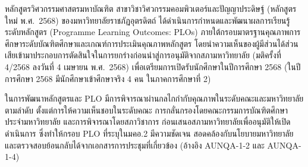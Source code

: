 


หลักสูตรวิศวกรรมศาสตรมหาบัณฑิต สาขาวิชาวิศวกรรมคอมพิวเตอร์และปัญญาประดิษฐ์ (หลักสูตรใหม่ พ.ศ.~2568) ของมหาวิทยาลัยราชภัฏอุตรดิตถ์ ได้ดำเนินการกำหนดและพัฒนาผลการเรียนรู้ระดับหลักสูตร (Programme Learning Outcomes: PLOs) ภายใต้กรอบมาตรฐานคุณภาพการศึกษาระดับบัณฑิตศึกษาและเกณฑ์การประเมินคุณภาพหลักสูตร โดยนำความเห็นของผู้มีส่วนได้ส่วนเสียเข้ามาประกอบการตัดสินใจในการยกร่างก่อนนำสู่การอนุมัติจากสภามหาวิทยาลัย (มติครั้งที่ 4/2568 ลงวันที่ 4 เมษายน พ.ศ.~2568) เพื่อเตรียมการเปิดรับนักศึกษาในปีการศึกษา 2568 (ในปีการศึกษา 2568 มีนักศึกษาเข้าศึกษาจริง 4 คน ในภาคการศึกษาที่ 2)

ในการพัฒนาหลักสูตรและ PLO มีการพิจารณาผ่านกลไกกำกับคุณภาพในระดับคณะและมหาวิทยาลัยตามลำดับ ตั้งแต่การให้ความเห็นชอบในระดับคณะ การกลั่นกรองโดยคณะกรรมการบัณฑิตศึกษาประจำมหาวิทยาลัย และการพิจารณาโดยสภาวิชาการ ก่อนเสนอสภามหาวิทยาลัยเพื่ออนุมัติให้เปิดดำเนินการ ซึ่งทำให้กรอบ PLO ที่ระบุในมคอ.2 มีความชัดเจน สอดคล้องกับนโยบายมหาวิทยาลัย และตรวจสอบย้อนกลับได้จากเอกสารการประชุมที่เกี่ยวข้อง (อ้างอิง AUNQA-1-2 และ AUNQA-1-4)

